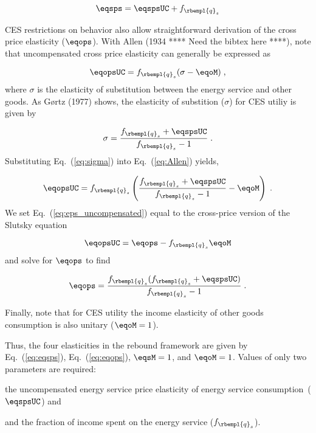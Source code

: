 \begin{equation} \label{eq:eqsps}
  \eqsps = \eqspsUC + f_{\rbempl{q}_s}
\end{equation}

CES restrictions on behavior also allow straightforward derivation 
of the cross price elasticity ($\eqops$).
With Allen (1934 **** Need the bibtex here ****), 
note that uncompensated cross price elasticity can generally be expressed as

\begin{equation} \label{eq:Allen}
  \eqopsUC = f_{\rbempl{q}_s} (\sigma - \eqoM) \; ,
\end{equation}
%
where $\sigma$ is the elasticity of substitution 
between the energy service and other goods.
As G{\o}rtz (1977) shows, the elasticity 
of substition ($\sigma$) for CES utiliy is given by

\begin{equation} \label{eq:sigma}
  \sigma  = \frac{f_{\rbempl{q}_s} + \eqspsUC}{f_{\rbempl{q}_s} -1 } \; .
\end{equation}
%
Substituting Eq.~(\ref{eq:sigma}) into Eq.~(\ref{eq:Allen}) yields, 

\begin{equation} \label{eq:eps_uncompensated}
  \eqopsUC = f_{\rbempl{q}_s} \left( \frac{f_{\rbempl{q}_s} + \eqspsUC}{f_{\rbempl{q}_s} -1 } - \eqoM \right) \; .
\end{equation}
%
We set Eq.~(\ref{eq:eps_uncompensated}) equal to 
the cross-price version of the Slutsky equation

\begin{equation}
  \eqopsUC = \eqops - f_{\rbempl{q}_s} \eqoM
\end{equation}
%
and solve for $\eqops$ to find

\begin{equation} \label{eq:eqops}
  \eqops = \frac{f_{\rbempl{q}_s} (f_{\rbempl{q}_s} + \eqspsUC)}{f_{\rbempl{q}_s}-1} \; .
\end{equation}

Finally, note that for CES utility the income elasticity of other goods consumption
is also unitary ($\eqoM = 1$). 

Thus, the four elasticities in the rebound framework are given by
Eq.~(\ref{eq:eqsps}), 
Eq.~(\ref{eq:eqops}), 
$\eqsM = 1$, and 
$\eqoM = 1$.
Values of only two parameters are required:
%
\begin{enumerate*}[label={(\alph*)}]
	
  \item the uncompensated energy service price elasticity of energy service consumption~($\eqspsUC$) and
  
  \item and the fraction of income spent on the energy service ($f_{\rbempl{q}_s}$).
    
\end{enumerate*}

